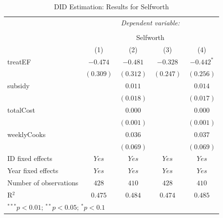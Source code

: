 \documentclass[12pt, a4paper, titlepage]{article}\usepackage[]{graphicx}\usepackage[]{color}
\begin{document}
\begin{table}
\begin{center}
\begin{tabular}{l c c c c}
\\[-1.8ex]\hline
& \multicolumn{4}{c}{\textit{Dependent variable:}} \\
\cline{2-5}
\\[-1.8ex] & \multicolumn{4}{c}{Selfworth} \\
\hline
 & (1) & (2) & (3) & (4) \\
\hline
treatEF                & $-0.474$  & $-0.481$  & $-0.328$  & $-0.442^{*}$ \\
                       & $(0.309)$ & $(0.312)$ & $(0.247)$ & $(0.256)$    \\
subsidy                &           & $0.011$   &           & $0.014$      \\
                       &           & $(0.018)$ &           & $(0.017)$    \\
totalCost              &           & $0.000$   &           & $0.000$      \\
                       &           & $(0.001)$ &           & $(0.001)$    \\
weeklyCooks            &           & $0.036$   &           & $0.037$      \\
                       &           & $(0.069)$ &           & $(0.069)$    \\
\hline
ID fixed effects       & $Yes$     & $Yes$     & $Yes$     & $Yes$        \\
Year fixed effects     & $Yes$     & $Yes$     & $Yes$     & $Yes$        \\
Number of observations & $428$     & $410$     & $428$     & $410$        \\
R$^2$                  & $0.475$   & $0.484$   & $0.474$   & $0.485$      \\
\hline
\multicolumn{5}{l}{\scriptsize{$^{***}p<0.01$; $^{**}p<0.05$; $^{*}p<0.1$}}
\end{tabular}
\caption{DID Estimation: Results for Selfworth}
\label{table:coefficients2}
\end{center}
\end{table}
\end{document}

